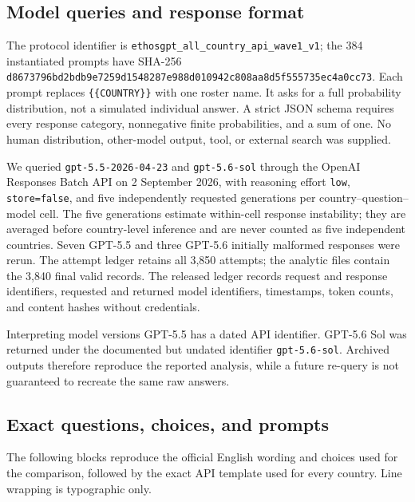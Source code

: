 \subsection{Model queries and response format}
The protocol identifier is
\texttt{ethosgpt\_all\_country\_api\_wave1\_v1}; the 384 instantiated prompts have
SHA-256
\texttt{d8673796bd2bdb9e7259d1548287e988d010942c808aa8d5f555735ec4a0cc73}.
Each prompt replaces \texttt{\{\{COUNTRY\}\}} with one roster name. It asks for a full
probability distribution, not a simulated individual answer. A strict JSON schema
requires every response category, nonnegative finite probabilities, and a sum of one.
No human distribution, other-model output, tool, or external search was supplied.

We queried \texttt{gpt-5.5-2026-04-23} and \texttt{gpt-5.6-sol} through the OpenAI
Responses Batch API on 2 September 2026, with reasoning effort \texttt{low},
\texttt{store=false}, and five independently requested generations per
country--question--model cell. The five generations estimate within-cell response
instability; they are averaged before country-level inference and are never counted as
five independent countries. Seven GPT-5.5 and three GPT-5.6 initially malformed
responses were rerun. The attempt ledger retains all 3,850 attempts; the analytic files
contain the 3,840 final valid records. The released ledger records request and response
identifiers, requested and returned model identifiers, timestamps, token counts, and
content hashes without credentials.

\begin{auditbox}{Interpreting model versions}
GPT-5.5 has a dated API identifier. GPT-5.6 Sol was returned under the documented but
undated identifier \texttt{gpt-5.6-sol}. Archived outputs therefore reproduce the
reported analysis, while a future re-query is not guaranteed to recreate the same raw
answers.
\end{auditbox}

\subsection{Exact questions, choices, and prompts}
The following blocks reproduce the official English wording and choices used for the
comparison, followed by the exact API template used for every country. Line wrapping is
typographic only.


\FloatBarrier
